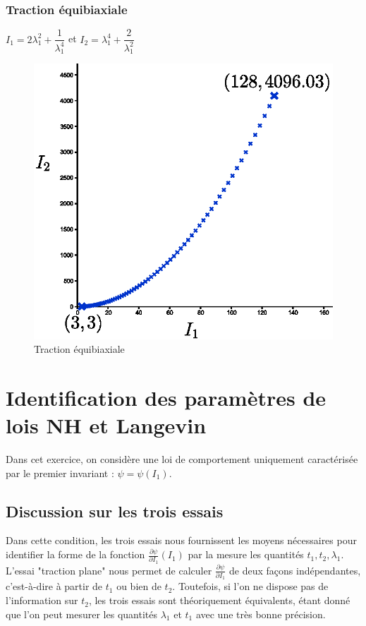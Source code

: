 \documentclass[a4paper,11pt]{article}
\begin{document}
\newpage
\subsubsection{Traction équibiaxiale}
$I_1=2\lambda_1^2+\dfrac{1}{\lambda_1^4}$ et $I_2=\lambda_1^4+\dfrac{2}{\lambda_1^2}$
	
\begin{figure}[!ht]
\centering\includegraphics[scale=0.8]{scilab/q2-6-3.eps} 
\caption{Traction équibiaxiale}
\label{fig:tract_equi}
\end{figure}

\section{Identification des paramètres de lois NH et Langevin}

Dans cet exercice, on considère une loi de comportement uniquement caractérisée par le premier invariant : $\psi = \psi(I_1)$.

\subsection {Discussion sur les trois essais}

Dans cette condition, les trois essais nous fournissent les moyens nécessaires pour identifier la forme de la fonction $\frac{\partial\psi}{\partial I_1} (I_1)$ par la mesure les quantités $t_1, t_2, \lambda_1$. L'essai "traction plane" nous permet de calculer $\frac{\partial\psi}{\partial I_1}$ de deux façons indépendantes, c'est-à-dire à partir de $t_1$ ou bien de $t_2$. Toutefois, si l'on ne dispose pas de l'information sur $t_2$, les trois essais sont théoriquement équivalents, étant donné que l'on peut mesurer les quantités $\lambda_1$ et $t_1$ avec une très bonne précision.
\end{document}
